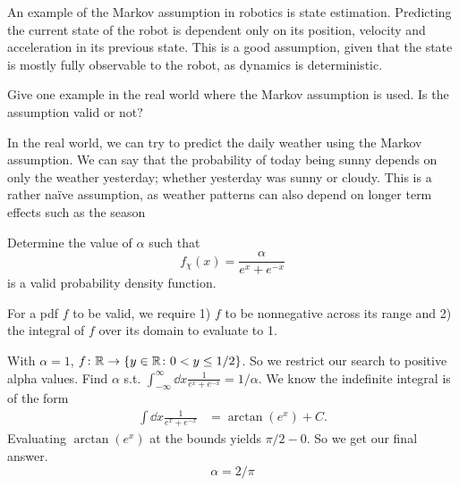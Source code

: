 \documentclass{article}
\begin{document}
    \begin{solution}
        An example of the Markov assumption in robotics is state estimation. Predicting the current state of the robot is dependent only on its position, velocity and acceleration in its previous state.
        This is a good assumption, given that the state is mostly fully observable to the robot, as dynamics is deterministic.
    \end{solution}

    \bigbreak
    \begin{problem}
        Give one example in the real world where the Markov assumption is used. Is the assumption valid or not?
    \end{problem}
    
    \begin{solution}
        In the real world, we can try to predict the daily weather using the Markov assumption. We can say that the probability of today being sunny depends on only the weather yesterday; whether yesterday was sunny or cloudy. This is a rather na\"ive assumption, as weather patterns can also depend on longer term effects such as the season
    \end{solution}

    \bigbreak
    \begin{problem}
        Determine the value of $\alpha$ such that
        \begin{equation}
            f_{\chi}(x) = \frac{\alpha}{e^x + e^{-x}}
        \end{equation}
        is a valid probability density function.
    \end{problem}

    \begin{solution}
        For a pdf $f$ to be valid, we require 1) $f$ to be nonnegative across its range and 2) the integral of $f$ over its domain to evaluate to 1. 
        
        With $\alpha = 1$, $f \colon \mathbb{R} \to \{y \in \mathbb{R} \colon 0 < y \leq 1/2\}$. So we restrict our search to positive alpha values. Find $\alpha$ s.t. $\int_{-\infty}^{\infty} \dd x \frac{1}{e^{x} + e^{-x}} = 1/\alpha$. We know the indefinite integral is of the form
        \begin{align*}
            \int \dd x \frac{1}{e^{x} + e^{-x}} &= \arctan(e^x) + C.
        \end{align*}
        Evaluating $\arctan(e^x)$ at the bounds yields $\pi/2 - 0$. So we get our final answer.
        \begin{equation}
            \alpha = 2/\pi
        \end{equation}

    \end{solution}
\end{document}
